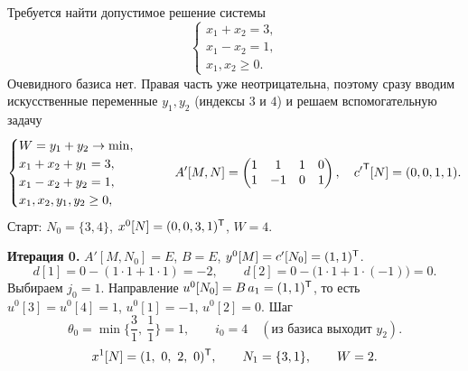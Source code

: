\begin{example}\label{ex:artificial-run}
Требуется найти допустимое решение системы
\[
  \begin{cases}
    x_1 + x_2 = 3 , \\
    x_1 - x_2 = 1 , \\
    x_1, x_2 \ge 0 .
  \end{cases}
\]
Очевидного базиса нет. Правая часть уже неотрицательна, поэтому сразу вводим
искусственные переменные $y_1, y_2$ (индексы $3$ и $4$) и решаем вспомогательную
задачу
\[
  \begin{cases}
    W = y_1 + y_2 \to \min , \\
    x_1 + x_2 + y_1 = 3 , \\
    x_1 - x_2 + y_2 = 1 , \\
    x_1, x_2, y_1, y_2 \ge 0 ,
  \end{cases}
  \qquad
  A'[M,N] = \begin{pmatrix} 1 & 1 & 1 & 0 \\ 1 & -1 & 0 & 1 \end{pmatrix} ,
  \quad {c'}^{\mathsf{T}}[N] = (0,0,1,1) .
\]
Старт: $N_0 = \{3,4\}$, $x^0[N] = (0,0,3,1)^{\mathsf{T}}$, $W = 4$.

\medskip
\noindent\textbf{Итерация 0.} $A'[M,N_0] = E$, $B = E$, $y^0[M] = c'[N_0] = (1,1)^{\mathsf{T}}$.
\[
  d[1] = 0 - (1\cdot 1 + 1\cdot 1) = -2 , \qquad
  d[2] = 0 - \big(1\cdot 1 + 1\cdot(-1)\big) = 0 .
\]
Выбираем $j_0 = 1$. Направление $u^0[N_0] = B\,a_1 = (1,1)^{\mathsf{T}}$, то есть
$u^0[3] = u^0[4] = 1$, $u^0[1] = -1$, $u^0[2] = 0$. Шаг
\[
  \theta_0 = \min\Big\{ \frac31,\ \frac11 \Big\} = 1 , \qquad i_0 = 4
  \quad (\text{из базиса выходит } y_2) .
\]
\[
  x^1[N] = (1,\ 0,\ 2,\ 0)^{\mathsf{T}} , \qquad N_1 = \{3,1\} , \qquad W = 2 .
\]


\end{example}
